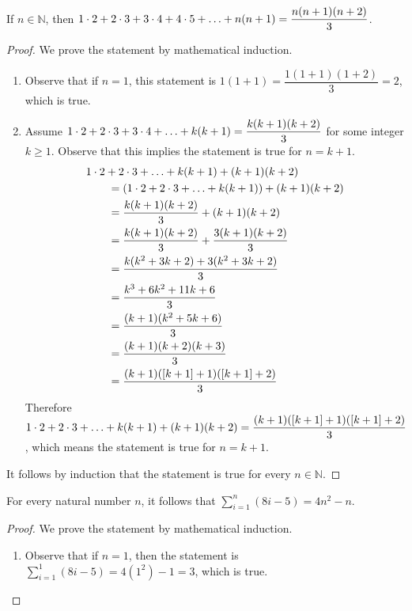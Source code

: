 \documentclass[DIN, pagenumber=false, fontsize=11pt, parskip=half]{scrartcl}
\begin{document}
\begin{problems}
    \problem If $n \in \mathbb{N}$, then $1\cdot2 + 2\cdot3 + 3\cdot4 + 4\cdot5 + \mathellipsis + n(n+1) = \dfrac{n(n+1)(n+2)}{3}$.
    \begin{proof}
        We prove the statement by mathematical induction.

        \begin{enumerate}
            \item Observe that if $n=1$, this statement is $1(1+1) = \dfrac{1(1+1)(1+2)}{3} = 2$, which is true.

            \item Assume $1\cdot2 + 2\cdot3 + 3\cdot4 + \mathellipsis + k(k+1) = \dfrac{k(k+1)(k+2)}{3}$ for some integer $k \geq 1$. Observe that this implies the statement is true for $n = k + 1$.
                \begin{align*}
                    \MoveEqLeft 1\cdot2 + 2\cdot3 + \mathellipsis + k(k+1) + (k+1)(k+2)\\
                    & = (1\cdot2 + 2\cdot3 + \mathellipsis + k(k+1)) + (k+1)(k+2)\\
                    & = \dfrac{k(k+1)(k+2)}{3} + (k+1)(k+2)\\
                    & = \dfrac{k(k+1)(k+2)}{3} + \dfrac{3(k+1)(k+2)}{3}\\
                    & = \dfrac{k(k^2+3k+2) + 3(k^2+3k+2)}{3}\\
                    & = \dfrac{k^3+6k^2+11k+6}{3}\\
                    & = \dfrac{(k+1)(k^2+5k+6)}{3}\\
                    & = \dfrac{(k+1)(k+2)(k+3)}{3}\\
                    & = \dfrac{(k+1)([k+1]+1)([k+1]+2)}{3}
                \end{align*}
                Therefore $1\cdot2+2\cdot3+\mathellipsis+k(k+1) + (k+1)(k+2) = \dfrac{(k+1)([k+1]+1)([k+1]+2)}{3}$, which means the statement is true for $n = k + 1$.
        \end{enumerate}
        It follows by induction that the statement is true for every $n \in \mathbb{N}$.
    \end{proof}

    \problem For every natural number $n$, it follows that $\sum\limits^{n}_{i=1}(8i-5) = 4n^2-n$.
    \begin{proof}
        We prove the statement by mathematical induction.
        \begin{enumerate}
            \item Observe that if $n=1$, then the statement is $\sum\limits^{1}_{i=1}(8i-5) = 4(1^2)-1 = 3$, which is true.


\end{enumerate}
\end{proof}
\end{problems}
\end{document}
